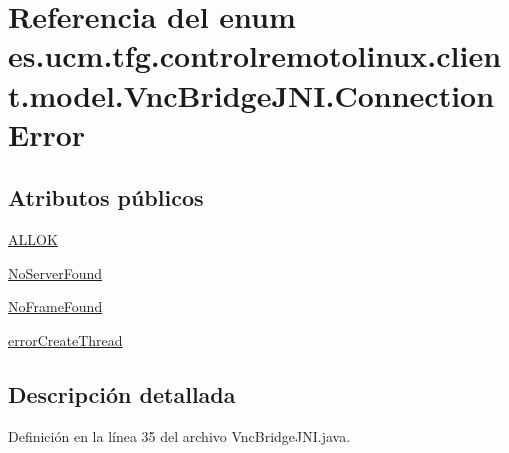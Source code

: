 \hypertarget{enumes_1_1ucm_1_1tfg_1_1controlremotolinux_1_1client_1_1model_1_1VncBridgeJNI_1_1ConnectionError}{\section{Referencia del enum es.\-ucm.\-tfg.\-controlremotolinux.\-client.\-model.\-Vnc\-Bridge\-J\-N\-I.\-Connection\-Error}
\label{enumes_1_1ucm_1_1tfg_1_1controlremotolinux_1_1client_1_1model_1_1VncBridgeJNI_1_1ConnectionError}
}
\subsection*{Atributos públicos}
\begin{DoxyCompactItemize}
\item 
\hyperlink{enumes_1_1ucm_1_1tfg_1_1controlremotolinux_1_1client_1_1model_1_1VncBridgeJNI_1_1ConnectionError_a8930d5ec0d2c18eb0ddff23fa412fa4e}{A\-L\-L\-O\-K}
\item 
\hyperlink{enumes_1_1ucm_1_1tfg_1_1controlremotolinux_1_1client_1_1model_1_1VncBridgeJNI_1_1ConnectionError_a455ef547660109752a4fcd677dbaf574}{No\-Server\-Found}
\item 
\hyperlink{enumes_1_1ucm_1_1tfg_1_1controlremotolinux_1_1client_1_1model_1_1VncBridgeJNI_1_1ConnectionError_afbe2036cc30e922ee76a255392dd745d}{No\-Frame\-Found}
\item 
\hyperlink{enumes_1_1ucm_1_1tfg_1_1controlremotolinux_1_1client_1_1model_1_1VncBridgeJNI_1_1ConnectionError_a5e2c7dc8996340be3fbaf56eafe9cc83}{error\-Create\-Thread}
\end{DoxyCompactItemize}


\subsection{Descripción detallada}


Definición en la línea 35 del archivo Vnc\-Bridge\-J\-N\-I.\-java.



